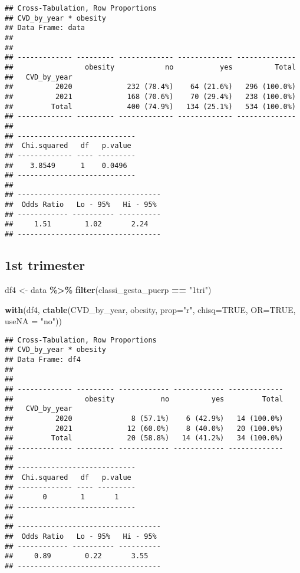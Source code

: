 \documentclass[
]{article}
\newenvironment{Shaded}{\begin{snugshade}}{\end{snugshade}}
\newcommand{\AttributeTok}[1]{\textcolor[rgb]{0.13,0.29,0.53}{#1}}
\newcommand{\ConstantTok}[1]{\textcolor[rgb]{0.56,0.35,0.01}{#1}}
\newcommand{\FunctionTok}[1]{\textcolor[rgb]{0.13,0.29,0.53}{\textbf{#1}}}
\newcommand{\NormalTok}[1]{#1}
\newcommand{\OtherTok}[1]{\textcolor[rgb]{0.56,0.35,0.01}{#1}}
\newcommand{\SpecialCharTok}[1]{\textcolor[rgb]{0.81,0.36,0.00}{\textbf{#1}}}
\newcommand{\StringTok}[1]{\textcolor[rgb]{0.31,0.60,0.02}{#1}}
\begin{document}
\begin{verbatim}
## Cross-Tabulation, Row Proportions  
## CVD_by_year * obesity  
## Data Frame: data  
## 
## 
## ------------- --------- ------------- ------------- --------------
##                 obesity            no           yes          Total
##   CVD_by_year                                                     
##          2020             232 (78.4%)    64 (21.6%)   296 (100.0%)
##          2021             168 (70.6%)    70 (29.4%)   238 (100.0%)
##         Total             400 (74.9%)   134 (25.1%)   534 (100.0%)
## ------------- --------- ------------- ------------- --------------
## 
## ----------------------------
##  Chi.squared   df   p.value 
## ------------- ---- ---------
##    3.8549      1    0.0496  
## ----------------------------
## 
## ----------------------------------
##  Odds Ratio   Lo - 95%   Hi - 95% 
## ------------ ---------- ----------
##     1.51        1.02       2.24   
## ----------------------------------
\end{verbatim}

\hypertarget{st-trimester-5}{%
\subsection{1st trimester}\label{st-trimester-5}}

\begin{Shaded}
\begin{Highlighting}[]
\NormalTok{df4 }\OtherTok{\textless{}{-}}\NormalTok{ data }\SpecialCharTok{\%\textgreater{}\%} 
  \FunctionTok{filter}\NormalTok{(classi\_gesta\_puerp }\SpecialCharTok{==} \StringTok{"1tri"}\NormalTok{)}

\FunctionTok{with}\NormalTok{(df4, }\FunctionTok{ctable}\NormalTok{(CVD\_by\_year, obesity, }\AttributeTok{prop=}\StringTok{"r"}\NormalTok{, }\AttributeTok{chisq=}\ConstantTok{TRUE}\NormalTok{, }\AttributeTok{OR=}\ConstantTok{TRUE}\NormalTok{, }\AttributeTok{useNA =} \StringTok{"no"}\NormalTok{))}
\end{Highlighting}
\end{Shaded}

\begin{verbatim}
## Cross-Tabulation, Row Proportions  
## CVD_by_year * obesity  
## Data Frame: df4  
## 
## 
## ------------- --------- ------------ ------------ -------------
##                 obesity           no          yes         Total
##   CVD_by_year                                                  
##          2020              8 (57.1%)    6 (42.9%)   14 (100.0%)
##          2021             12 (60.0%)    8 (40.0%)   20 (100.0%)
##         Total             20 (58.8%)   14 (41.2%)   34 (100.0%)
## ------------- --------- ------------ ------------ -------------
## 
## ----------------------------
##  Chi.squared   df   p.value 
## ------------- ---- ---------
##       0        1       1    
## ----------------------------
## 
## ----------------------------------
##  Odds Ratio   Lo - 95%   Hi - 95% 
## ------------ ---------- ----------
##     0.89        0.22       3.55   
## ----------------------------------
\end{verbatim}
\end{document}

